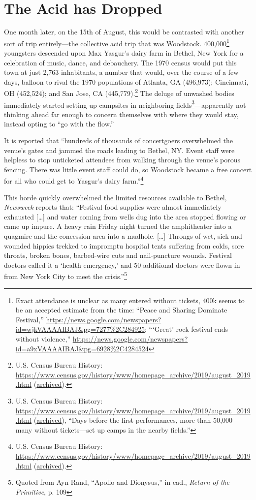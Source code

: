 \documentclass[11pt]{article}
\begin{document}
\section{The Acid has Dropped}
\label{sec:org7f614bf}
One month later, on the 15th of August, this would be contrasted with another sort of trip entirely---the collective acid trip that was Woodstock. 400,000\footnote{Exact attendance is unclear as many entered without tickets, 400k seems to be an accepted estimate from the time: ``Peace and Sharing Dominate Festival,'' \url{https://news.google.com/newspapers?id=wjkVAAAAIBAJ\&pg=7277\%2C284925}; ```Great' rock festival ends without violence,'' \url{https://news.google.com/newspapers?id=a9xVAAAAIBAJ\&pg=6928\%2C4284524}} youngsters descended upon Max Yasgur's dairy farm in Bethel, New York for a celebration of music, dance, and debauchery. The 1970 census would put this town at just 2,763 inhabitants, a number that would, over the course of a few days, balloon to rival the 1970 populations of Atlanta, GA (496,973); Cincinnati, OH (452,524); and San Jose, CA (445,779).\footnote{U.S. Census Bureau History: \url{https://www.census.gov/history/www/homepage\_archive/2019/august\_2019.html} (\href{https://archive.ph/RB1XC}{archived}).} The deluge of unwashed bodies immediately started setting up campsites in neighboring fields\footnote{U.S. Census Bureau History: \url{https://www.census.gov/history/www/homepage\_archive/2019/august\_2019.html} (\href{https://archive.ph/RB1XC}{archived}), ``Days before the first performances, more than 50,000—many without tickets—set up camps in the nearby fields.''}---apparently not thinking ahead far enough to concern themselves with where they would stay, instead opting to ``go with the flow.''

It is reported that ``hundreds of thousands of concertgoers overwhelmed the venue's gates and jammed the roads leading to Bethel, NY. Event staff were helpless to stop unticketed attendees from walking through the venue's porous fencing. There was little event staff could do, so Woodstock became a free concert for all who could get to Yasgur's dairy farm.''\footnote{U.S. Census Bureau History: \url{https://www.census.gov/history/www/homepage\_archive/2019/august\_2019.html} (\href{https://archive.ph/RB1XC}{archived}).}

This horde quickly overwhelmed the limited resources available to Bethel, \emph{Newsweek} reports that: ``Festival food supplies were almost immediately exhausted [\ldots{}] and water coming from wells dug into the area stopped flowing or came up impure. A heavy rain Friday night turned the amphitheater into a quagmire and the concession area into a mudhole. [\ldots{}] Throngs of wet, sick and wounded hippies trekked to impromptu hospital tents suffering from colds, sore throats, broken bones, barbed-wire cuts and nail-puncture wounds. Festival doctors called it a `health emergency,' and 50 additional doctors were flown in from New York City to meet the crisis.''\footnote{Quoted from Ayn Rand, ``Apollo and Dionysus,'' in ead., \emph{Return of the Primitive}, p. 109}
\end{document}
